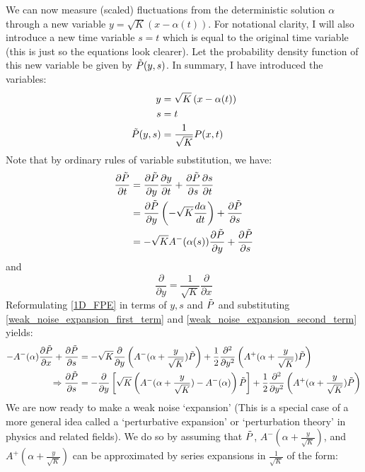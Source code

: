 We can now measure (scaled) fluctuations from the deterministic solution $\alpha$ through a new variable $y=\sqrt{K}\left(x-\alpha(t)\right)$. For notational clarity, I will also introduce a new time variable $s=t$ which is equal to the original time variable (this is just so the equations look clearer). Let the probability density function of this new variable be given by $\Tilde{P}(y,s)$. In summary, I have introduced the variables:
\begin{align*}
y &= \sqrt{K}\left(x-\alpha(t)\right)\\
s &= t\\
\Tilde{P}(y,s) &= \frac{1}{\sqrt{K}}P(x,t)
\end{align*}
Note that by ordinary rules of variable substitution, we have:
\begin{align}
\frac{\partial \Tilde{P}}{\partial t} &= \frac{\partial \Tilde{P}}{\partial y}\frac{\partial y}{\partial t} + \frac{\partial \Tilde{P}}{\partial s}\frac{\partial s}{\partial t}\nonumber\\
&=\frac{\partial \Tilde{P}}{\partial y}\left( -\sqrt{K}\frac{d\alpha}{dt}\right) + \frac{\partial \Tilde{P}}{\partial s}\nonumber\\
&= -\sqrt{K}A^{-}(\alpha(s))\frac{\partial \Tilde{P}}{\partial y} + \frac{\partial \Tilde{P}}{\partial s}\label{weak_noise_expansion_first_term}
\end{align}
and
\begin{equation}
\label{weak_noise_expansion_second_term}
\frac{\partial }{\partial y} = \frac{1}{\sqrt{K}}\frac{\partial }{\partial x}
\end{equation}
Reformulating \eqref{1D_FPE} in terms of $y,s$ and $\Tilde{P}$ and substituting \eqref{weak_noise_expansion_first_term} and \eqref{weak_noise_expansion_second_term} yields:
\begin{align}
-A^-(\alpha)\frac{\partial\Tilde{P}}{\partial x} + \frac{\partial \Tilde{P}}{\partial s} &= -\sqrt{K}\frac{\partial}{\partial y}\left(A^-(\alpha+\frac{y}{\sqrt{K}})\Tilde{P}\right)+\frac{1}{2}\frac{\partial^2}{\partial y^2}\left(A^+(\alpha+\frac{y}{\sqrt{K}})\Tilde{P}\right)\nonumber\\
\Rightarrow \frac{\partial \Tilde{P}}{\partial s} &= -\frac{\partial}{\partial y}\left[\sqrt{K}\left(A^-(\alpha+\frac{y}{\sqrt{K}})-A^-(\alpha)\right)\Tilde{P}\right]+\frac{1}{2}\frac{\partial^2}{\partial y^2}\left(A^+(\alpha+\frac{y}{\sqrt{K}})\Tilde{P}\right)\label{weak_noise_exact_equation}
\end{align}
We are now ready to make a weak noise `expansion' (This is a special case of a more general idea called a `perturbative expansion' or `perturbation theory' in physics and related fields). We do so by assuming that $\Tilde{P}$, $A^-(\alpha + \frac{y}{\sqrt{K}})$, and $A^+(\alpha+\frac{y}{\sqrt{K}})$ can be approximated by series expansions in $\frac{1}{\sqrt{K}}$ of the form:
